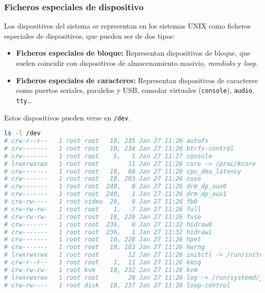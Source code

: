 \pagebreak

\subsubsection{Ficheros especiales de dispositivo}

Los dispositivos del sistema se representan en los sistemas UNIX como ficheros especiales de dispositivos, que pueden ser de dos tipos:

\begin{itemize}
	\item\textbf{Ficheros especiales de bloque:} Representan dispositivos de bloque, que suelen coincidir con dispositivos de almacenamiento masivio, \emph{ramdisks} y \emph{loop}.
	\item\textbf{Ficheros especiales de caracteres:} Representan dispositivos de caracteres como puertos seriales, paralelos y USB, consolar virtuales (\texttt{console}), \texttt{audio}, \texttt{tty}\ldots
\end{itemize}

Estos dispositivos pueden verse en \texttt{/dev}.

\begin{lstlisting}[language=Bash]
ls -l /dev
# crw-r--r--   1 root root   10, 235 Jan 27 11:26 autofs
# crw-------   1 root root   10, 234 Jan 27 11:26 btrfs-control
# crw-------   1 root root    5,   1 Jan 27 11:27 console
# lrwxrwxrwx   1 root root        11 Jan 27 11:26 core -> /proc/kcore
# crw-------   1 root root   10,  60 Jan 27 11:26 cpu_dma_latency
# crw-------   1 root root   10, 203 Jan 27 11:26 cuse
# crw-------   1 root root  240,   0 Jan 27 11:26 drm_dp_aux0
# crw-------   1 root root  240,   1 Jan 27 11:26 drm_dp_aux1
# crw-rw----   1 root video  29,   0 Jan 27 11:26 fb0
# crw-rw-rw-   1 root root    1,   7 Jan 27 11:26 full
# crw-rw-rw-   1 root root   10, 229 Jan 27 11:26 fuse
# crw-------   1 root root  236,   0 Jan 27 11:32 hidraw0
# crw-------   1 root root  236,   1 Jan 27 11:32 hidraw1
# crw-------   1 root root   10, 228 Jan 27 11:26 hpet
# crw-------   1 root root   10, 183 Jan 27 11:26 hwrng
# lrwxrwxrwx   1 root root        12 Jan 27 11:26 initctl -> /run/initctl
# crw-r--r--   1 root root    1,  11 Jan 27 11:26 kmsg
# crw-rw-rw-   1 root kvm    10, 232 Jan 27 11:26 kvm
# lrwxrwxrwx   1 root root        28 Jan 27 11:26 log -> /run/systemd/journal/dev-log
# crw-rw----   1 root disk   10, 237 Jan 27 11:26 loop-control
\end{lstlisting}


